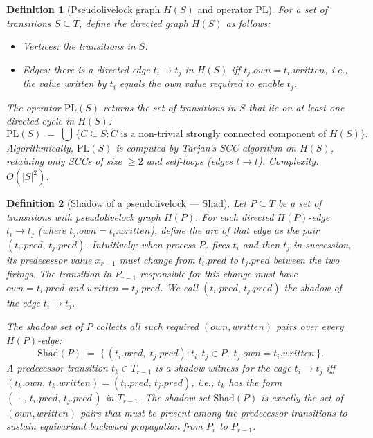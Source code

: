 \documentclass{article}
\newtheorem{definition}{Definition}
\newcommand{\PL}{\mathrm{PL}}
\newcommand{\Shad}{\mathrm{Shad}}
\newcommand{\own}{\mathit{own}}
\newcommand{\writ}{\mathit{written}}
\newcommand{\pred}{\mathit{pred}}
\begin{document}
\begin{definition}[Pseudolivelock graph $H(S)$ and operator $\PL$]
\label{def:H}
For a set of transitions $S\subseteq T$, define the directed graph
$H(S)$ as follows:
\begin{itemize}
  \item \emph{Vertices}: the transitions in $S$.
  \item \emph{Edges}: there is a directed edge $t_i\!\to\!t_j$ in
        $H(S)$ iff $t_j.\own = t_i.\writ$, i.e., the value written by
        $t_i$ equals the own value required to enable $t_j$.
\end{itemize}
The operator $\PL(S)$ returns the set of transitions in $S$ that lie on
at least one directed cycle in $H(S)$:
\[
  \PL(S) \;=\; \bigcup\, \{C \subseteq S : C \text{ is a non-trivial
  strongly connected component of } H(S)\}.
\]
Algorithmically, $\PL(S)$ is computed by Tarjan's SCC algorithm on
$H(S)$, retaining only SCCs of size $\geq 2$ and self-loops (edges
$t\to t$). Complexity: $O(|S|^2)$.
\end{definition}

\begin{definition}[Shadow of a pseudolivelock --- $\Shad$]
\label{def:shad}
Let $P\subseteq T$ be a set of transitions with pseudolivelock graph
$H(P)$.  For each directed $H(P)$-edge $t_i\!\to\!t_j$ (where
$t_j.\own = t_i.\writ$), define the \emph{arc} of that edge as the
pair $(t_i.\pred,\, t_j.\pred)$.  Intuitively: when process $P_r$
fires $t_i$ and then $t_j$ in succession, its predecessor value
$x_{r-1}$ must change from $t_i.\pred$ to $t_j.\pred$ between the
two firings.  The transition in $P_{r-1}$ responsible for this change
must have $\own = t_i.\pred$ and $\writ = t_j.\pred$.  We call
$(t_i.\pred,\, t_j.\pred)$ the \emph{shadow} of the edge
$t_i\!\to\!t_j$.

The \emph{shadow set} of $P$ collects all such required $(\own,\writ)$
pairs over every $H(P)$-edge:
\[
  \Shad(P) \;=\;
  \bigl\{\,(t_i.\pred,\; t_j.\pred) :
     t_i,t_j\in P,\; t_j.\own = t_i.\writ\,\bigr\}.
\]
A predecessor transition $t_k\in T_{r-1}$ is a \emph{shadow witness}
for the edge $t_i\!\to\!t_j$ iff $(t_k.\own,\,t_k.\writ)=(t_i.\pred,\,t_j.\pred)$,
i.e., $t_k$ has the form $(\,\cdot\,,\, t_i.\pred,\, t_j.\pred\,)$
in $T_{r-1}$.  The shadow set $\Shad(P)$ is exactly the set of
$(\own,\writ)$ pairs that must be present among the predecessor
transitions to sustain equivariant backward propagation from $P_r$ to
$P_{r-1}$.
\end{definition}
\end{document}
